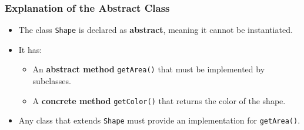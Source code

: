 \documentclass[aspectratio=169, table]{beamer}
\begin{document}
\begin{frame}[fragile]
	\frametitle{Explanation of the Abstract Class}
	
	\begin{itemize}
		\item The class \texttt{Shape} is declared as \textbf{abstract}, meaning it cannot be instantiated.
		\item It has:
		\begin{itemize}
			\item An \textbf{abstract method} \texttt{getArea()} that must be implemented by subclasses.
			\item A \textbf{concrete method} \texttt{getColor()} that returns the color of the shape.
		\end{itemize}
		\item Any class that extends \texttt{Shape} must provide an implementation for \texttt{getArea()}.
	\end{itemize}
\end{frame}

		
\end{document}
